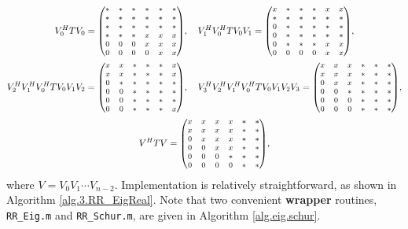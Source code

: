 \begin{gather*}
  V^H_0 T V_0 = {\footnotesize\begin{pmatrix} * & * & * & * & * & * \\ * & * & * & * & * & * \\ * & * & * & * & * & * \\ * & * & * & x & x & x \\ 0 & 0 & 0 & x & x & x \\ 0 & 0 & 0 & 0 & x & x \end{pmatrix}}, \quad 
  V^H_1 V^H_0 T V_0 V_1 = {\footnotesize\begin{pmatrix} x & * & * & * & x & x \\ * & * & * & * & * & * \\ 0 & * & * & * & * & * \\ 0 & * & * & * & * & * \\ 0 & * & * & * & x & x \\ 0 & 0 & 0 & 0 & x & x \end{pmatrix}}, \\
  V^H_2  V^H_1 V^H_0 T V_0  V_1 V_2 = {\footnotesize\begin{pmatrix} x & x & * & * & * & x \\ x & x & * & * & * & x \\ 0 & * & * & * & * & * \\ 0 & 0 & * & * & * & * \\ 0 & 0 & * & * & * & * \\ 0 & 0 & * & * & * & x \end{pmatrix}}, \quad
  V^H_3 V^H_2  V^H_1 V^H_0 T V_0 V_1 V_2 V_3 = {\footnotesize\begin{pmatrix} x & x & x & * & * & * \\ x & x & x & * & * & * \\ 0 & x & x & * & * & * \\ 0 & 0 & * & * & * & * \\ 0 & 0 & 0 & * & * & * \\ 0 & 0 & 0 & * & * & * \end{pmatrix}}, \\
  V^H T V = {\footnotesize\begin{pmatrix} x & x & x & x & * & * \\ x & x & x & x & * & * \\ 0 & x & x & x & * & * \\ 0 & 0 & x & x & * & * \\ 0 & 0 & 0 & * & * & * \\ 0 & 0 & 0 & 0 & * & * \end{pmatrix}},
\end{gather*}
where $V=V_0 V_1 \cdots V_{n-2}$.  Implementation is relatively straightforward, as shown in Algorithm \ref{alg.3.RR_EigReal}.  Note that two convenient {\bf wrapper} routines, {\tt RR_Eig.m} and {\tt RR_Schur.m},
are given in Algorithm \ref{alg.eig.schur}.

